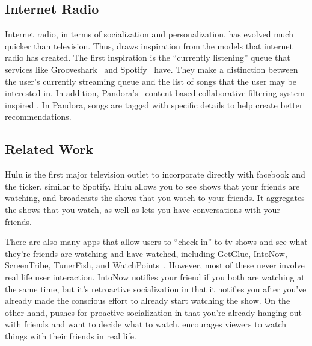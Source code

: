 \subsection{Internet Radio}
Internet radio, in terms of socialization and personalization, has
evolved much quicker than television.  Thus, {\sys} draws inspiration
from the models that internet radio has created.  The first
inspiration is the “currently listening” queue that services like
Grooveshark~\cite{grooveshark} and Spotify~\cite{spotify} have.  They
make a distinction between the user’s currently streaming queue and
the list of songs that the user may be interested in.  In addition,
Pandora’s~\cite{pandora} content-based collaborative filtering system
inspired {\sys}.  In Pandora, songs are tagged with specific details
to help create better recommendations.

\subsection{Related Work}
Hulu is the first major television outlet to incorporate directly with
facebook and the ticker, similar to Spotify.  Hulu allows you to see
shows that your friends are watching, and broadcasts the shows that
you watch to your friends.  It aggregates the shows that you watch, as
well as lets you have conversations with your friends.

There are also many apps that allow users to “check in” to tv shows
and see what they’re friends are watching and have watched, including
GetGlue, IntoNow, ScreenTribe, TunerFish, and WatchPoints~\cite{chausse}.  
However, most of these never involve real life user
interaction.  IntoNow notifies your friend if you both are watching at
the same time, but it's retroactive socialization in that it notifies
you after you've already made the conscious effort to already start
watching the show.  On the other hand, {\sys} pushes for proactive
socialization in that you're already hanging out with friends and want
to decide what to watch.  {\sys} encourages viewers to watch things
with their friends in real life.
